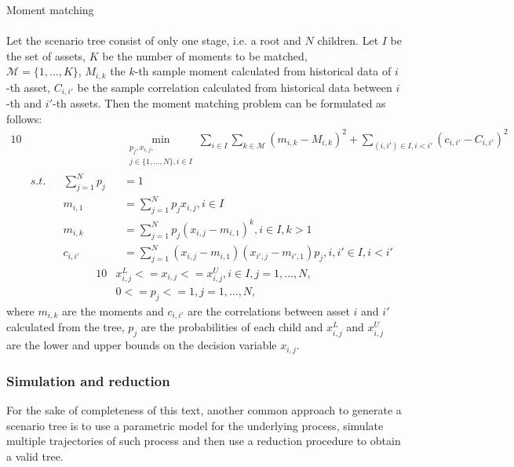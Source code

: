 \begin{defn}{Moment matching \label{defn:moment_matching_method}
\\
\cite[p. 9]{moment_matching_agarwal}}
\\
Let the scenario tree consist of only one stage, i.e. a root and $N$ children. Let $I$ be the set of assets, $K$ be the number of moments to be matched, \\ $\mathcal{M}=\{1,\dots,K\}$, $M_{i,k}$ the $k$-th sample moment calculated from historical data of $i$-th asset, $C_{i,i'}$ be the sample correlation calculated from historical data between $i$-th and $i'$-th assets. Then the moment matching problem can be formulated as follows:
\begin{alignat}{10}
& && && \underset{\substack{p_j, x_{i,j}, \\ j \in \{1,...,N\}, i \in I}}{\min} \sum_{i\in I} \sum_{k\in \mathcal{M}} \left(m_{i,k} - M_{i,k}\right)^2 + \sum_{(i, i') \in I, i < i'}(c_{i,i'}-C_{i,i'})^2 \nonumber \\
& s.t. && \sum_{j=1}^N p_j&&=1 \nonumber \\
& && m_{i,1}&&=\sum_{j=1}^N p_jx_{i,j}, i \in I \nonumber \\
& && m_{i,k}&&=\sum_{j=1}^N p_j(x_{i,j}-m_{i,1})^k, i \in I, k>1 \nonumber \\
& && c_{i,i'}&&=\sum_{j=1}^N(x_{i,j}-m_{i,1})(x_{i',j}-m_{i',1})p_j, i,i' \in I, i<i' \nonumber
\end{alignat}
\vspace{-0.5cm}
\begin{alignat}{10}
& x_{i,j}^L<=x_{i,j}<=x_{i,j}^U, i \in I, j=1,\dots,N, \nonumber \\
& 0 <= p_j <= 1, j=1,\dots,N, \nonumber
\end{alignat}
where $m_{i,k}$ are the moments and $c_{i,i'}$ are the correlations between asset $i$ and $i'$ calculated from the tree, $p_j$ are the probabilities of each child and $x_{i,j}^L$ and $x_{i,j}^U$ are the lower and upper bounds on the decision variable $x_{i,j}$.
\end{defn}


\subsubsection{Simulation and reduction}
For the sake of completeness of this text, another common approach to generate a scenario tree is to use a parametric model for the underlying process, simulate multiple trajectories of such process and then use a reduction procedure to obtain a valid tree. 

